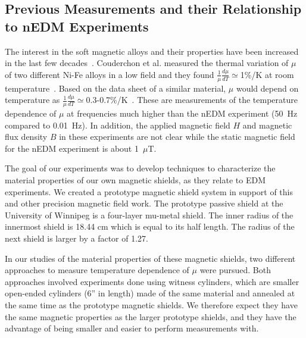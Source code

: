 \documentclass[review]{elsarticle}
\begin{document}
\subsection{Previous Measurements and their Relationship to nEDM Experiments\label{previousmeasurement}}

The interest in the soft magnetic alloys and their properties have
been increased in the last few
decades~\cite{bib:pfeifer,bib:bozorth,bib:couderchon}. Couderchon et
al. measured the thermal variation of $\mu$ of two different Ni-Fe
alloys in a low field and they found $\frac{1}{\mu}\frac{d\mu}{dT}\simeq$1\%/K at room
temperature~\cite{bib:couderchon}. Based on the data sheet of a
similar material, $\mu$ would depend on temperature as
$\frac{1}{\mu}\frac{d\mu}{dT}\simeq$0.3-0.7\%/K~\cite{bib:kruppvdm}. These
are measurements of the temperature dependence of $\mu$ at frequencies
much higher than the nEDM experiment (50~Hz compared to 0.01~Hz). In
addition, the applied magnetic field $H$ and magnetic flux density $B$
in these experiments are not clear while the static magnetic field for
the nEDM experiment is about 1~$\mu$T.

The goal of our experiments was to develop techniques to characterize
the material properties of our own magnetic shields, as they relate to
EDM experiments.  We created a prototype magnetic shield system in
support of this and other precision magnetic field work.
The prototype passive shield at the University of Winnipeg is a four-layer mu-metal shield. The inner radius of the innermost shield is 18.44 cm which is equal to its half length. The radius of the next shield is larger by a factor of 1.27.




In our studies of the material properties of these magnetic shields,
two different approaches to measure temperature dependence of $\mu$
were pursued.  Both approaches involved experiments done using witness
cylinders, which are smaller open-ended cylinders (6'' in length) made
of the same material and annealed at the same time as the prototype
magnetic shields.  We therefore expect they have the same magnetic
properties as the larger prototype shields, and they have the
advantage of being smaller and easier to perform measurements with.
\end{document}
